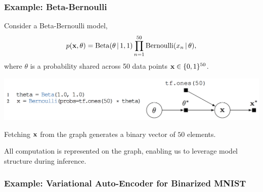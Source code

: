 \documentclass[10pt,
               xcolor={usenames,dvipsnames},
               hyperref={colorlinks,linktoc=all,citecolor=Plum,linkcolor=MidnightBlue,urlcolor=MidnightBlue},noamssymb]{beamer}
\begin{document}
\begin{frame}
\frametitle{Example: Beta-Bernoulli}
Consider a Beta-Bernoulli model,
\begin{align*}
p(\boldsymbol{\mathbf{x}}, \theta) =
\operatorname{Beta}(\theta\,|\, 1, 1)
\prod_{n=1}^{50} \operatorname{Bernoulli}(x_n\,|\, \theta),
\end{align*}
where $\theta$
is a probability shared across 50 data points $\boldsymbol{\mathbf{x}}\in\{0,1\}^{50}$.
\begin{center}
\vspace{-2ex}
\includegraphics[height=0.175\textwidth]{img/beta-bernoulli.png}
\end{center}
Fetching $\boldsymbol{\mathbf{x}}$ from the graph generates a binary vector of $50$ elements.

All computation is represented on the graph, enabling us to leverage model structure during inference.
\end{frame}

\begin{frame}
\frametitle{Example: Variational Auto-Encoder for Binarized MNIST}
\end{frame}
\end{document}
